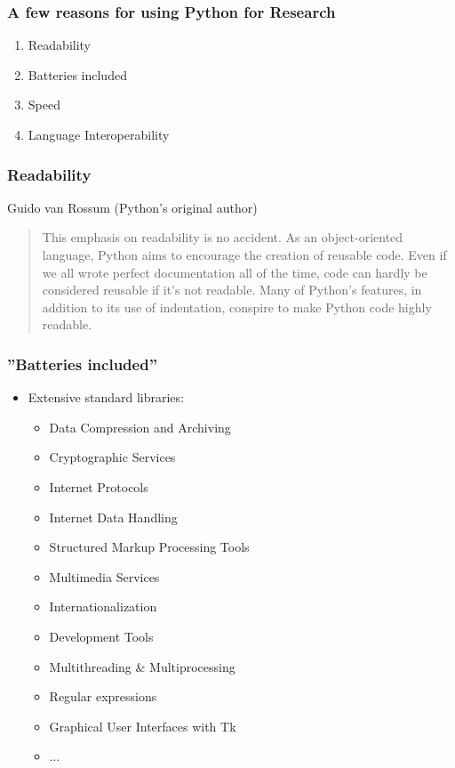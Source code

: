 \begin{frame}[fragile]
    \frametitle{A few reasons for using Python for Research}
    \begin{enumerate}
        \item Readability
        \item Batteries included
        \item Speed
        \item Language Interoperability
    \end{enumerate}
\end{frame}


\begin{frame}[fragile]
    \frametitle{Readability}
    Guido van Rossum (Python's original author)
        \begin{quote}
This emphasis on readability is no accident. As an object-oriented language, Python aims to encourage the creation of reusable code. Even if we all wrote perfect documentation all of the time, code can hardly be considered reusable if it's not readable. Many of Python’s features, in addition to its use of indentation, conspire to make Python code highly readable.
    \end{quote}
\end{frame}

\begin{frame}[fragile]
    \frametitle{''Batteries included''}
    \begin{itemize}
        \item Extensive standard libraries:
        \begin{itemize}
            \item Data Compression and Archiving
            \item Cryptographic Services
            \item Internet Protocols
            \item Internet Data Handling
            \item Structured Markup Processing Tools
            \item Multimedia Services
            \item Internationalization
            \item Development Tools
            \item Multithreading \& Multiprocessing
            \item Regular expressions
            \item Graphical User Interfaces with Tk
            \item ...
        \end{itemize}
    \end{itemize}
\end{frame}

